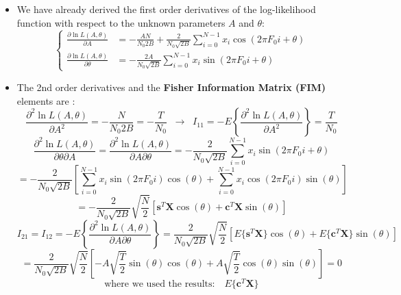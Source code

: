 \begin{itemize}
\[
\mathbf{C}_\theta \ge CRB(A, \theta) = \mathbf{I}^{-1}(A, \theta)
= \left[
\begin{matrix}
- E\left\{\frac{\partial^2 \ln L(A, \theta)}{\partial A^2}\right\} & -E\left\{ \frac{\partial^2 \ln L(A, \theta)}{\partial A \partial \theta} \right\} \\
- E\left\{ \frac{\partial^2 \ln L(A, \theta)}{\partial \theta \partial A} \right\} & -E\left\{ \frac{\partial^2 \ln L(A, \theta)}{\partial \theta^2} \right\}
\end{matrix}
\right]^{-1}
\]

    
    \item We have already derived the first order derivatives of the log-likelihood function with respect to the unknown parameters \(A\) and \(\theta\):
\[
\left\{
\begin{aligned}
\frac{\partial \ln L(A, \theta)}{\partial A} &=
- \frac{A N}{N_0 2B}
+ \frac{2}{N_0 \sqrt{2B}} \sum_{i=0}^{N-1} x_i \cos\left(2\pi F_0 i + \theta\right)
\\[2ex]
\frac{\partial \ln L(A, \theta)}{\partial \theta} &=
- \frac{2A}{N_0 \sqrt{2B}}
\sum_{i=0}^{N-1} x_i \sin\left(2\pi F_0 i + \theta\right)
\end{aligned}
\right.
\]
    \item The 2nd order derivatives and the \textbf{Fisher Information Matrix (FIM)} elements are :
    \[
\frac{\partial^2 \ln L(A, \theta)}{\partial A^2} =
- \frac{N}{N_0 2B}
= -\frac{T}{N_0}
\;\; \rightarrow \;\;
I_{11} = -E\left\{ \frac{\partial^2 \ln L(A, \theta)}{\partial A^2} \right\}
= \frac{T}{N_0}
\]
\[
\frac{\partial^2 \ln L(A, \theta)}{\partial \theta \partial A}
= \frac{\partial^2 \ln L(A, \theta)}{\partial A \partial \theta}
= -\frac{2}{N_0 \sqrt{2B}} \sum_{i=0}^{N-1} x_i \sin(2\pi F_0 i + \theta)
\]
\[
= -\frac{2}{N_0 \sqrt{2B}}
\left[
\sum_{i=0}^{N-1} x_i \sin(2\pi F_0 i) \cos(\theta)
+ \sum_{i=0}^{N-1} x_i \cos(2\pi F_0 i) \sin(\theta)
\right]
\]
\[
= -\frac{2}{N_0 \sqrt{2B}} \sqrt{\frac{N}{2}}
\left[
\mathbf{s}^T \mathbf{X} \cos(\theta)
+ \mathbf{c}^T \mathbf{X} \sin(\theta)
\right]
\]
\[
I_{21} = I_{12}
= -E\left\{ \frac{\partial^2 \ln L(A, \theta)}{\partial A \partial \theta} \right\}
= \frac{2}{N_0 \sqrt{2B}} \sqrt{\frac{N}{2}}
\left[ E\{\mathbf{s}^T\mathbf{X}\} \cos(\theta) + E\{\mathbf{c}^T\mathbf{X}\} \sin(\theta) \right]
\]
\[
= \frac{2}{N_0 \sqrt{2B}}
\sqrt{\frac{N}{2}}
\left[
- A\sqrt{\frac{T}{2}} \sin(\theta) \cos(\theta)
+ A\sqrt{\frac{T}{2}} \cos(\theta) \sin(\theta)
\right]
= 0
\]
\[
\text{where we used the results:}
\quad
E\{ \mathbf{c}^T \mathbf{X} \}
\]
\end{itemize}
